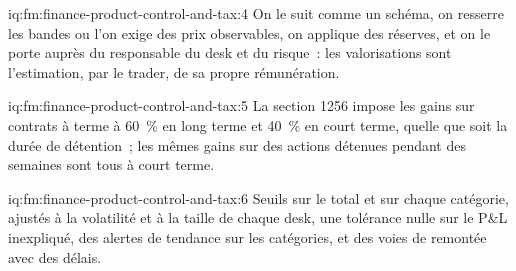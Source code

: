 \begin{solution}{iq:fm:finance-product-control-and-tax:4}
On le suit comme un schéma, on resserre les bandes ou l'on exige des prix observables, on applique des réserves, et on le porte auprès du responsable du desk et du risque~:
les valorisations sont l'estimation, par le trader, de sa propre rémunération.
\end{solution}

\begin{solution}{iq:fm:finance-product-control-and-tax:5}
La section 1256 impose les gains sur contrats à terme à 60~\% en long terme et 40~\% en court terme, quelle que soit la durée de détention~; les mêmes gains sur des actions détenues pendant des semaines sont tous
à court terme.
\end{solution}

\begin{solution}{iq:fm:finance-product-control-and-tax:6}
Seuils sur le total et sur chaque catégorie, ajustés à la volatilité et à la taille de chaque desk, une tolérance nulle sur le P\&L inexpliqué, des alertes de tendance sur
les catégories, et des voies de remontée avec des délais.
\end{solution}
